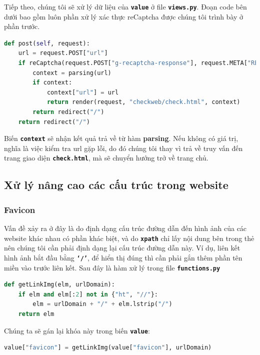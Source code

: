 Tiếp theo, chúng tôi sẽ xử lý dữ liệu của \textbf{\texttt{value}} ở file \textbf{\texttt{views.py}}. Đoạn code bên dưới bao gồm luôn phần xử lý xác thực reCaptcha được chúng tôi trình bày ở phần trước.
\begin{lstlisting}[language=Python]
def post(self, request):
    url = request.POST["url"]
    if reCaptcha(request.POST["g-recaptcha-response"], request.META["REMOTE_ADDR"]):
        context = parsing(url)
        if context:
            context["url"] = url
            return render(request, "checkweb/check.html", context)
        return redirect("/")
    return redirect("/")
\end{lstlisting}
\par
Biến \textbf{\texttt{context}} sẽ nhận kết quả trả về từ hàm \textbf{parsing}. Nếu không có giá trị, nghĩa là việc kiểm tra url gặp lỗi, do đó chúng tôi thay vì trả về truy vấn đến trang giao diện \textbf{\texttt{check.html}}, mà sẽ chuyển hướng trở về trang chủ.
\subsection{Xử lý nâng cao các cấu trúc trong website}
\subsubsection{Favicon}
Vấn đề xảy ra ở đây là do định dạng cấu trúc đường dẫn đến hình ảnh của các website khác nhau có phần khác biệt, và do \textbf{\texttt{xpath}} chỉ lấy nội dung bên trong thẻ nên chúng tôi cần phải định dạng lại cấu trúc đường dẫn này. Ví dụ, liên kết hình ảnh bắt đầu bằng \textbf{\texttt{`/'}}, để hiển thị đúng thì cần phải gắn thêm phần tên miền vào trước liên kết. Sau đây là hàm xử lý trong file \textbf{\texttt{functions.py}}
\begin{lstlisting}[language=Python]
def getLinkImg(elm, urlDomain):
    if elm and elm[:2] not in {"ht", "//"}:
        elm = urlDomain + "/" + elm.lstrip("/")
    return elm
\end{lstlisting}
\par
Chúng ta sẽ gán lại khóa này trong biến \textbf{\texttt{value}}:
\begin{lstlisting}[language=Python]
value["favicon"] = getLinkImg(value["favicon"], urlDomain)
\end{lstlisting}
